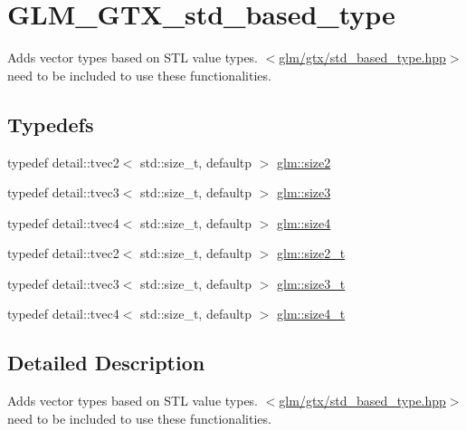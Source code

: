 \hypertarget{group__gtx__std__based__type}{}\section{G\+L\+M\+\_\+\+G\+T\+X\+\_\+std\+\_\+based\+\_\+type}
\label{group__gtx__std__based__type}


Adds vector types based on S\+TL value types. $<$\hyperlink{std__based__type_8hpp}{glm/gtx/std\+\_\+based\+\_\+type.\+hpp}$>$ need to be included to use these functionalities.  


\subsection*{Typedefs}
\begin{DoxyCompactItemize}
\item 
typedef detail\+::tvec2$<$ std\+::size\+\_\+t, defaultp $>$ \hyperlink{group__gtx__std__based__type_ga393e8beba20ea33452384087a2864f86}{glm\+::size2}
\item 
typedef detail\+::tvec3$<$ std\+::size\+\_\+t, defaultp $>$ \hyperlink{group__gtx__std__based__type_gae1dda4cdccd4c1abeeb2e470c048d0c9}{glm\+::size3}
\item 
typedef detail\+::tvec4$<$ std\+::size\+\_\+t, defaultp $>$ \hyperlink{group__gtx__std__based__type_gac04a40cfe44b5035770cf26d98a9349d}{glm\+::size4}
\item 
typedef detail\+::tvec2$<$ std\+::size\+\_\+t, defaultp $>$ \hyperlink{group__gtx__std__based__type_ga64be170f9203528ff59efa40b1977bb0}{glm\+::size2\+\_\+t}
\item 
typedef detail\+::tvec3$<$ std\+::size\+\_\+t, defaultp $>$ \hyperlink{group__gtx__std__based__type_gad9ddaab6dd4c37ba46b74a1423ef2ba3}{glm\+::size3\+\_\+t}
\item 
typedef detail\+::tvec4$<$ std\+::size\+\_\+t, defaultp $>$ \hyperlink{group__gtx__std__based__type_gaaaf9b6a73135945e356601a01beece30}{glm\+::size4\+\_\+t}
\end{DoxyCompactItemize}


\subsection{Detailed Description}
Adds vector types based on S\+TL value types. $<$\hyperlink{std__based__type_8hpp}{glm/gtx/std\+\_\+based\+\_\+type.\+hpp}$>$ need to be included to use these functionalities. 




